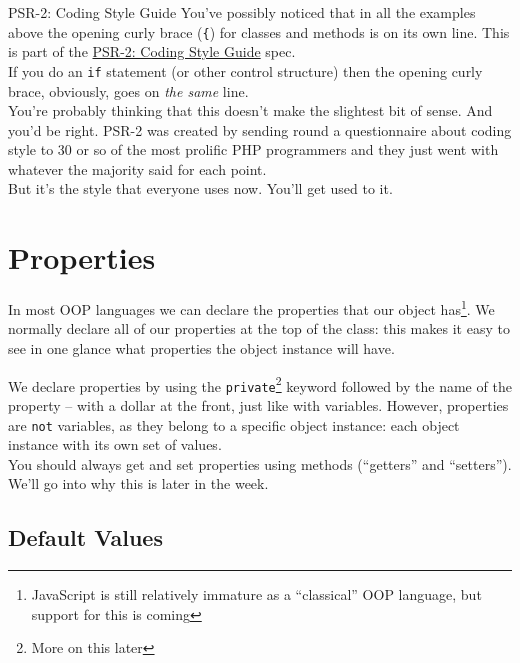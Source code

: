 \begin{infobox}{PSR-2: Coding Style Guide}
    You've possibly noticed that in all the examples above the opening curly brace (\texttt{\{}) for classes and methods is on its own line. This is part of the \href{https://www.php-fig.org/psr/psr-2/}{PSR-2: Coding Style Guide} spec.
    \\

    If you do an \texttt{if} statement (or other control structure) then the opening curly brace, obviously, goes on \textit{the same} line.
    \\

    You're probably thinking that this doesn't make the slightest bit of sense. And you'd be right. PSR-2 was created by sending round a questionnaire about coding style to 30 or so of the most prolific PHP programmers and they just went with whatever the majority said for each point.
    \\

    But it's the style that everyone uses now. You'll get used to it.
\end{infobox}

\section{Properties}

In most OOP languages we can declare the properties that our object has\footnote{JavaScript is still relatively immature as a ``classical'' OOP language, but support for this is coming}. We normally declare all of our properties at the top of the class: this makes it easy to see in one glance what properties the object instance will have.


We declare properties by using the \texttt{private}\footnote{More on this later} keyword followed by the name of the property – with a dollar at the front, just like with variables. However, properties are \texttt{not} variables, as they belong to a specific object instance: each object instance with its own set of values.
\\

You should always get and set properties using methods (``getters'' and ``setters''). We'll go into why this is later in the week.


\subsection{Default Values}

